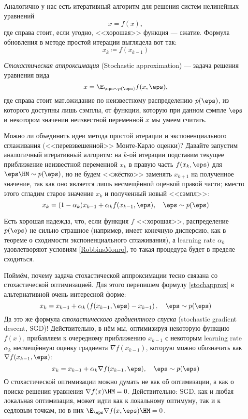 Аналогично у нас есть итеративный алгоритм для решения систем нелинейных уравнений
$$x = f(x),$$
где справа стоит, если угодно, <<хорошая>> функция --- сжатие. Формула обновления в методе простой итерации выглядела вот так:
$$x_k \coloneqq f(x_{k-1})$$

\begin{definition}
\emph{Стохастическая аппроксимация} (Stochastic approximation) --- задача решения уравнения вида
\begin{equation}\label{stochapproxeq}
x = \E_{\eps \sim p(\eps)} f(x, \eps),
\end{equation}
где справа стоит мат.ожидание по неизвестному распределению $p(\eps)$, из которого доступны лишь сэмплы, от функции, которую при данном сэмпле $\eps$ и некотором значении неизвестной переменной $x$ мы умеем считать. 
\end{definition}

Можно ли объединить идеи метода простой итерации и экспоненциального сглаживания (<<перевзвешенной>> Монте-Карло оценки)? Давайте запустим аналогичный итеративный алгоритм: на $k$-ой итерации подставим текущее приближение неизвестной переменной $x_k$ в правую часть $f(x_k, \eps)$ для $\eps \HM\sim p(\eps)$, но не будем <<жёстко>> заменять $x_{k+1}$ на полученное значение, так как оно является лишь несмещённой оценкой правой части; вместо этого сгладим старое значение $x_k$ и полученный новый <<сэмпл>>:
\begin{equation}\label{stochapprox}
x_k = (1 - \alpha_k)x_{k-1} + \alpha_k f(x_{k-1}, \eps), \quad \eps \sim p(\eps)
\end{equation}

Есть хорошая надежда, что, если функция $f$ <<хорошая>>, распределение $p(\eps)$ не сильно страшное (например, имеет конечную дисперсию, как в теореме о сходимости экспоненциального сглаживания), а learning rate $\alpha_k$ удовлетворяют условиям \eqref{RobbinsMonro}, то такая процедура будет в пределе сходиться.

Поймём, почему задача стохастической аппроксимации тесно связана со стохастической оптимизацией. Для этого перепишем формулу \eqref{stochapprox} в альтернативной очень интересной форме:
\begin{equation}\label{stochapproxgrad}
x_k = x_{k-1} + \alpha_k \left( f(x_{k-1}, \eps) - x_{k-1} \right), \quad \eps \sim p(\eps)
\end{equation}
Да это же формула \emph{стохастического градиентного спуска} (stochastic gradient descent, SGD)! Действительно, в нём мы, оптимизируя некоторую функцию $f(x)$, прибавляем к очередному приближению $x_{k-1}$ с некоторым learning rate $\alpha_k$ несмещённую оценку градиента $\nabla f(x_{k-1})$, которую можно обозначить как $\nabla f(x_{k-1}, \eps)$:
$$x_k = x_{k-1} + \alpha_k \nabla f(x_{k-1}, \eps), \quad \eps \sim p(\eps)$$
О стохастической оптимизации можно думать не как об оптимизации, а как о поиске решения уравнения $\nabla f(x) \HM= 0$. Действительно: SGD, как и любая локальная оптимизация, может идти как к локальному оптимуму, так и к седловым точкам, но в них $\E_{\eps} \nabla f(x, \eps) \HM= 0$.

